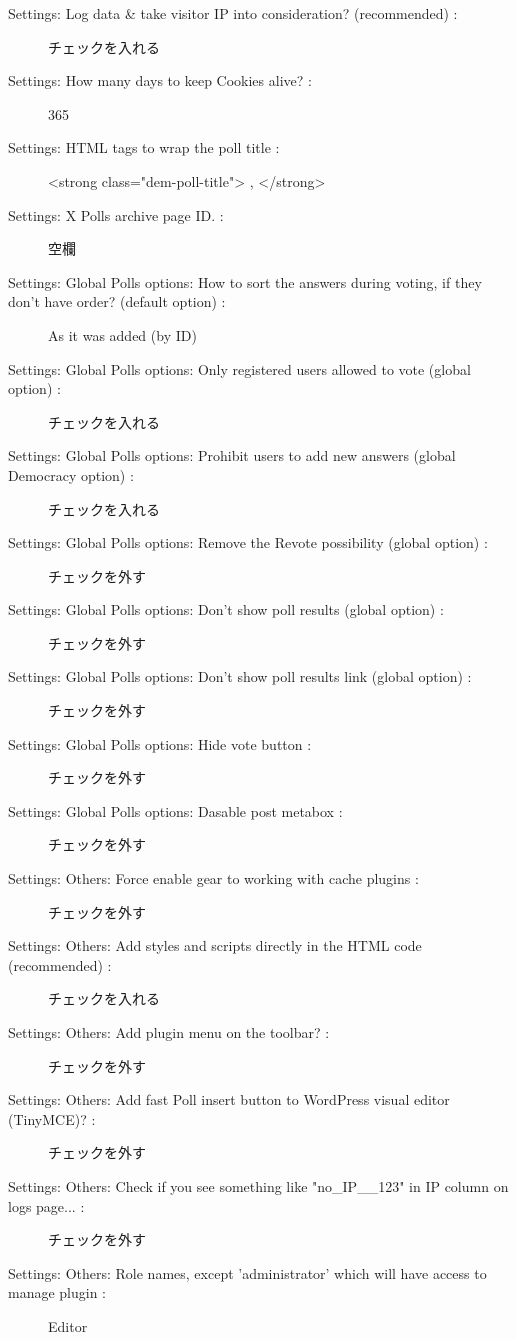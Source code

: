 \documentclass[titlepage,10pt,a4paper,uplatex]{jsbook}
\begin{document}
\begin{description}
\item[Settings: Log data \& take visitor IP into consideration? (recommended) : ] チェックを入れる
\item[Settings: How many days to keep Cookies alive? : ] 365
\item[Settings: HTML tags to wrap the poll title : ] {\textless}strong class="dem-poll-title"{\textgreater} , {\textless}/strong{\textgreater}
\item[Settings: X Polls archive page ID. : ] 空欄
\item[Settings: Global Polls options: How to sort the answers during voting, if they don't have order? (default option) : ] As it was added (by ID)
\item[Settings: Global Polls options: Only registered users allowed to vote (global option) : ] チェックを入れる
\item[Settings: Global Polls options: Prohibit users to add new answers (global Democracy option) : ] チェックを入れる
\item[Settings: Global Polls options: Remove the Revote possibility (global option) : ] チェックを外す
\item[Settings: Global Polls options: Don't show poll results (global option) : ] チェックを外す
\item[Settings: Global Polls options: Don't show poll results link (global option) : ] チェックを外す
\item[Settings: Global Polls options: Hide vote button : ] チェックを外す
\item[Settings: Global Polls options: Dasable post metabox : ] チェックを外す
\item[Settings: Others: Force enable gear to working with cache plugins : ] チェックを外す
\item[Settings: Others: Add styles and scripts directly in the HTML code (recommended) : ] チェックを入れる
\item[Settings: Others: Add plugin menu on the toolbar? : ] チェックを外す
\item[Settings: Others: Add fast Poll insert button to WordPress visual editor (TinyMCE)? : ] チェックを外す
\item[Settings: Others: Check if you see something like "no\_IP\_\_123" in IP column on logs page... : ] チェックを外す
\item[Settings: Others: Role names, except 'administrator' which will have access to manage plugin : ] Editor
\end{description}
\end{document}
